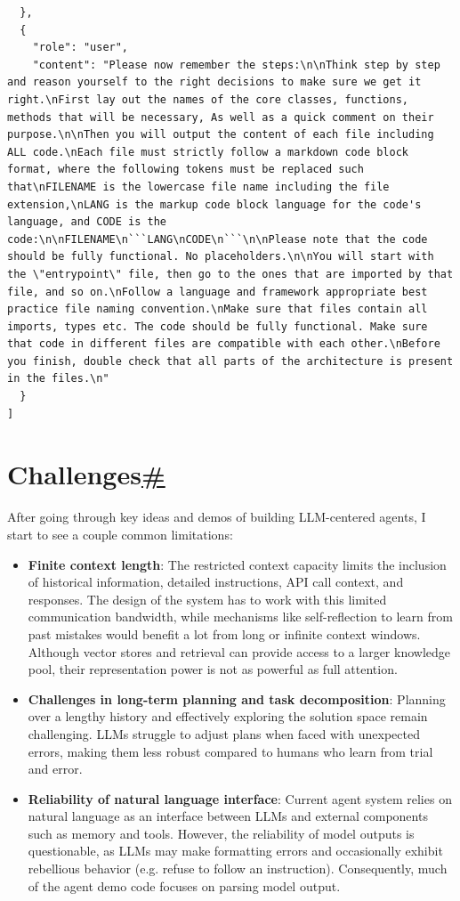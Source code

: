 \begin{verbatim}
  },
  {
    "role": "user",
    "content": "Please now remember the steps:\n\nThink step by step and reason yourself to the right decisions to make sure we get it right.\nFirst lay out the names of the core classes, functions, methods that will be necessary, As well as a quick comment on their purpose.\n\nThen you will output the content of each file including ALL code.\nEach file must strictly follow a markdown code block format, where the following tokens must be replaced such that\nFILENAME is the lowercase file name including the file extension,\nLANG is the markup code block language for the code's language, and CODE is the code:\n\nFILENAME\n```LANG\nCODE\n```\n\nPlease note that the code should be fully functional. No placeholders.\n\nYou will start with the \"entrypoint\" file, then go to the ones that are imported by that file, and so on.\nFollow a language and framework appropriate best practice file naming convention.\nMake sure that files contain all imports, types etc. The code should be fully functional. Make sure that code in different files are compatible with each other.\nBefore you finish, double check that all parts of the architecture is present in the files.\n"
  }
]
\end{verbatim}

\section{\texorpdfstring{Challenges\hyperref[challenges]{\#}}{Challenges\#}}\label{challenges}

After going through key ideas and demos of building LLM-centered agents, I start to see a couple common limitations:

\begin{itemize}
\item
  \textbf{Finite context length}: The restricted context capacity limits the inclusion of historical information, detailed instructions, API call context, and responses. The design of the system has to work with this limited communication bandwidth, while mechanisms like self-reflection to learn from past mistakes would benefit a lot from long or infinite context windows. Although vector stores and retrieval can provide access to a larger knowledge pool, their representation power is not as powerful as full attention.
\item
  \textbf{Challenges in long-term planning and task decomposition}: Planning over a lengthy history and effectively exploring the solution space remain challenging. LLMs struggle to adjust plans when faced with unexpected errors, making them less robust compared to humans who learn from trial and error.
\item
  \textbf{Reliability of natural language interface}: Current agent system relies on natural language as an interface between LLMs and external components such as memory and tools. However, the reliability of model outputs is questionable, as LLMs may make formatting errors and occasionally exhibit rebellious behavior (e.g. refuse to follow an instruction). Consequently, much of the agent demo code focuses on parsing model output.
\end{itemize}

